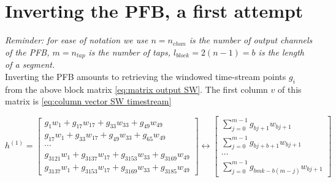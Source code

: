 \documentclass[12pt]{article}
\newcommand{\ntap}{n_{tap}}
\newcommand{\nchan}{n_{chan}}
\newcommand{\lblock}{l_{block}}
\begin{document}




\section{Inverting the PFB, a first attempt}\label{sec:inverse pfb prior}

\textit{Reminder: for ease of notation we use $n=\nchan$ is the number of output channels of the PFB, $m=\ntap$ is the number of taps, $\lblock = 2(n-1) = b$ is the length of a segment.} \\

Inverting the PFB amounts to retrieving the windowed time-stream points $g_i$ from the above block matrix \eqref{eq:matrix output SW}. The first column $v$ of this matrix is \eqref{eq:column vector SW timestream} 

\begin{equation}\label{eq:column vector SW timestream}
h^{(1)} = 
    \begin{bmatrix}
        g_1w_1+g_{17}w_{17}+g_{33}w_{33}+g_{49}w_{49}\\
        g_{17}w_1+g_{33}w_{17}+g_{49}w_{33}+g_{65}w_{49}\\
        \cdots\\
        g_{3121}w_1+g_{3137}w_{17}+g_{3153}w_{33}+g_{3169}w_{49}\\
        g_{3137}w_1+g_{3153}w_{17}+g_{3169}w_{33}+g_{3185}w_{49}
    \end{bmatrix}
    \longleftrightarrow
    \begin{bmatrix}
        \sum_{j=0}^{m-1} g_{bj + 1}w_{bj + 1}\\
        \sum_{j=0}^{m-1} g_{bj + b + 1}w_{bj + 1}\\
        \cdots \\
        \sum_{j=0}^{m-1} g_{bmk-b(m-j)}w_{bj + 1}
    \end{bmatrix}
\end{equation}
\vspace{0.25cm}
\end{document}
